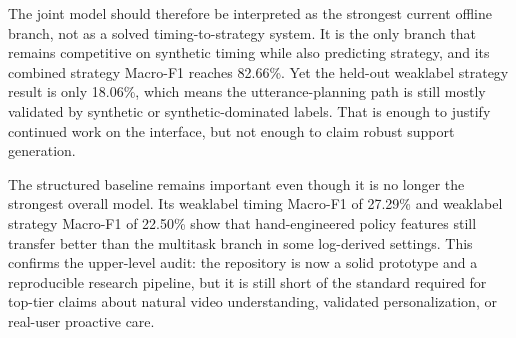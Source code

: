 The joint model should therefore be interpreted as the strongest current offline branch, not as a solved timing-to-strategy system. It is the only branch that remains competitive on synthetic timing while also predicting strategy, and its combined strategy Macro-F1 reaches 82.66\%. Yet the held-out weaklabel strategy result is only 18.06\%, which means the utterance-planning path is still mostly validated by synthetic or synthetic-dominated labels. That is enough to justify continued work on the interface, but not enough to claim robust support generation.

The structured baseline remains important even though it is no longer the strongest overall model. Its weaklabel timing Macro-F1 of 27.29\% and weaklabel strategy Macro-F1 of 22.50\% show that hand-engineered policy features still transfer better than the multitask branch in some log-derived settings. This confirms the upper-level audit: the repository is now a solid prototype and a reproducible research pipeline, but it is still short of the standard required for top-tier claims about natural video understanding, validated personalization, or real-user proactive care.
